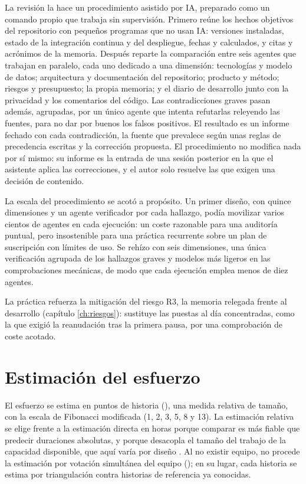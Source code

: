 La revisión la hace un procedimiento asistido por \ac{IA}, preparado como un comando propio que trabaja sin supervisión.
Primero reúne los hechos objetivos del repositorio con pequeños programas que no usan \ac{IA}: versiones instaladas, estado de la integración continua y del despliegue, fechas y  calculados, y citas y acrónimos de la memoria.
Después reparte la comparación entre seis agentes que trabajan en paralelo, cada uno dedicado a una dimensión: tecnologías y modelo de datos; arquitectura y documentación del repositorio; producto y método; riesgos y presupuesto; la propia memoria; y el diario de desarrollo junto con la privacidad y los comentarios del código.
Las contradicciones graves pasan además, agrupadas, por un único agente que intenta refutarlas releyendo las fuentes, para no dar por buenos los falsos positivos.
El resultado es un informe fechado con cada contradicción, la fuente que prevalece según unas reglas de precedencia escritas y la corrección propuesta.
El procedimiento no modifica nada por sí mismo: su informe es la entrada de una sesión posterior en la que el asistente aplica las correcciones, y el autor solo resuelve las que exigen una decisión de contenido.

La escala del procedimiento se acotó a propósito.
Un primer diseño, con quince dimensiones y un agente verificador por cada hallazgo, podía movilizar varios cientos de agentes en cada ejecución: un coste razonable para una auditoría puntual, pero insostenible para una práctica recurrente sobre un plan de suscripción con límites de uso.
Se rehízo con seis dimensiones, una única verificación agrupada de los hallazgos graves y modelos más ligeros en las comprobaciones mecánicas, de modo que cada ejecución emplea menos de diez agentes.

La práctica refuerza la mitigación del riesgo R3, la memoria relegada frente al desarrollo (capítulo \ref{ch:riesgos}): sustituye las puestas al día concentradas, como la que exigió la reanudación tras la primera pausa, por una comprobación de coste acotado.

\section{Estimación del esfuerzo}
\label{sec:estimacion}

El esfuerzo se estima en puntos de historia (), una medida relativa de tamaño, con la escala de Fibonacci modificada (1, 2, 3, 5, 8 y 13).
La estimación relativa se elige frente a la estimación directa en horas porque comparar es más fiable que predecir duraciones absolutas, y porque desacopla el tamaño del trabajo de la capacidad disponible, que aquí varía por diseño \parencite{cohn-estimating}.
Al no existir equipo, no procede la estimación por votación simultánea del equipo (); en su lugar, cada historia se estima por triangulación contra historias de referencia ya conocidas.

